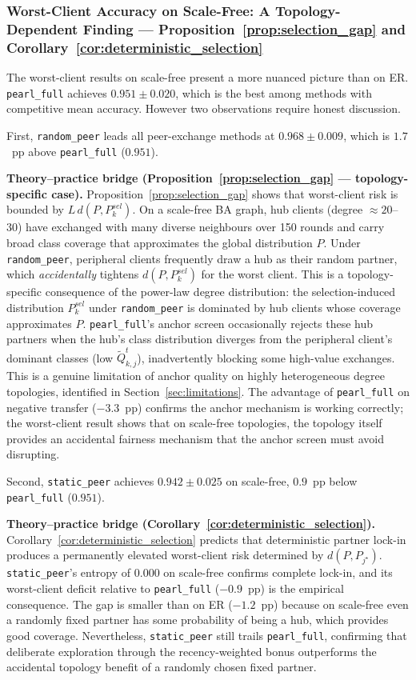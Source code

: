 \documentclass[conference]{IEEEtran}
\begin{document}
\subsubsection{Worst-Client Accuracy on Scale-Free: A Topology-Dependent Finding — Proposition~\ref{prop:selection_gap} and Corollary~\ref{cor:deterministic_selection}}
\label{subsubsec:sf-worst}

The worst-client results on scale-free present a more nuanced picture than on ER. \texttt{pearl\_full} achieves $0.951\pm0.020$, which is the best among methods with competitive mean accuracy. However two observations require honest discussion.

First, \texttt{random\_peer} leads all peer-exchange methods at $0.968\pm0.009$, which is $1.7$~pp above \texttt{pearl\_full} ($0.951$).

\textbf{Theory--practice bridge (Proposition~\ref{prop:selection_gap} — topology-specific case).}
Proposition~\ref{prop:selection_gap} shows that worst-client risk is bounded by $L\,d(P, P^{sel}_k)$. On a scale-free BA graph, hub clients (degree $\approx20$--30) have exchanged with many diverse neighbours over 150 rounds and carry broad class coverage that approximates the global distribution $P$. Under \texttt{random\_peer}, peripheral clients frequently draw a hub as their random partner, which \emph{accidentally} tightens $d(P, P^{sel}_k)$ for the worst client. This is a topology-specific consequence of the power-law degree distribution: the selection-induced distribution $P^{sel}_k$ under \texttt{random\_peer} is dominated by hub clients whose coverage approximates $P$. \texttt{pearl\_full}'s anchor screen occasionally rejects these hub partners when the hub's class distribution diverges from the peripheral client's dominant classes (low $\tilde{Q}^t_{k,j}$), inadvertently blocking some high-value exchanges. This is a genuine limitation of anchor quality on highly heterogeneous degree topologies, identified in Section~\ref{sec:limitations}. The advantage of \texttt{pearl\_full} on negative transfer ($-3.3$~pp) confirms the anchor mechanism is working correctly; the worst-client result shows that on scale-free topologies, the topology itself provides an accidental fairness mechanism that the anchor screen must avoid disrupting.

Second, \texttt{static\_peer} achieves $0.942\pm0.025$ on scale-free, $0.9$~pp below \texttt{pearl\_full} ($0.951$).

\textbf{Theory--practice bridge (Corollary~\ref{cor:deterministic_selection}).}
Corollary~\ref{cor:deterministic_selection} predicts that deterministic partner lock-in produces a permanently elevated worst-client risk determined by $d(P, P_{j^\star})$. \texttt{static\_peer}'s entropy of $0.000$ on scale-free confirms complete lock-in, and its worst-client deficit relative to \texttt{pearl\_full} ($-0.9$~pp) is the empirical consequence. The gap is smaller than on ER ($-1.2$~pp) because on scale-free even a randomly fixed partner has some probability of being a hub, which provides good coverage. Nevertheless, \texttt{static\_peer} still trails \texttt{pearl\_full}, confirming that deliberate exploration through the recency-weighted bonus outperforms the accidental topology benefit of a randomly chosen fixed partner.
\end{document}
